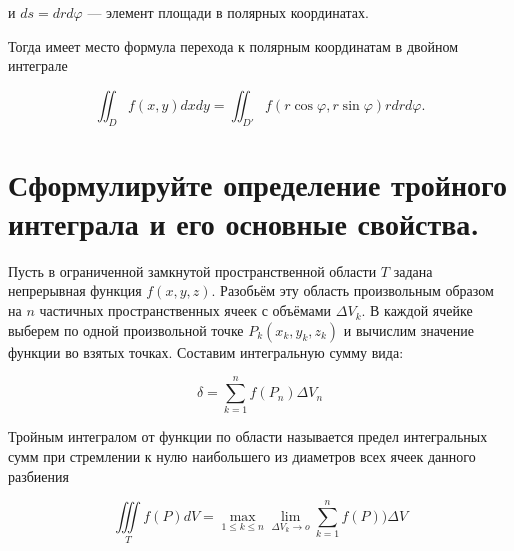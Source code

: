 \documentclass[16pt]{extarticle}
\begin{document}
и \( ds = drd\varphi \) --- элемент площади в полярных координатах.

Тогда имеет место формула перехода к полярным координатам в двойном интеграле

\[
  \iint_D f(x, y) dxdy = \iint_{D'} f(r\cos\varphi, r\sin\varphi) r dr d\varphi.
\]
\section{Сформулируйте определение тройного интеграла и его основные свойства.}
Пусть в ограниченной замкнутой пространственной области $T$ задана непрерывная функция $f(x, y, z)$.
Разобьём эту область произвольным образом на $n$ частичных пространственных ячеек с объёмами $\Delta V_k$.
В каждой ячейке выберем по одной произвольной точке $P_k(x_k, y_k, z_k)$ и вычислим значение функции
во взятых точках. Составим интегральную сумму вида:

\begin{equation}
  \delta = \sum_{k=1}^{n} f(P_n) \Delta{V_n}
\end{equation}

Тройным интегралом от функции по области называется предел интегральных сумм при стремлении к нулю наибольшего из диаметров всех ячеек данного разбиения

\begin{equation}
\iiint\limits_T f(P) dV =  \max\limits_\text{$1 \leq k \leq n$} \lim_{\Delta V_k \to o} \sum_{k=1}^{n} f(P)) \Delta{V}
\end{equation}
\end{document}

